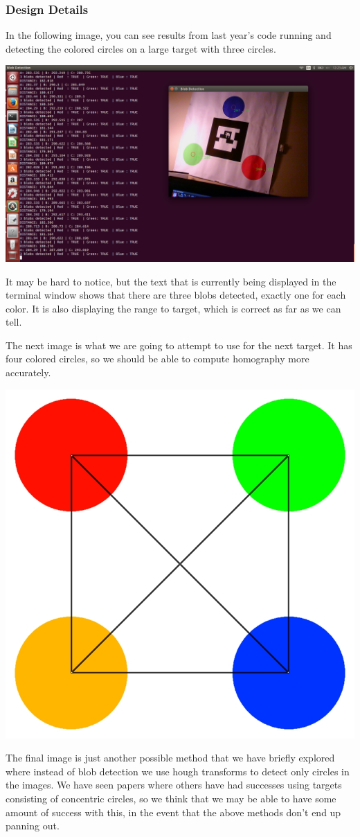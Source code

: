 \subsubsection{Design Details}
In the following image, you can see results from last year's code running and detecting the colored circles on a large target with three circles.

\begin{center} \includegraphics[width=.5\textwidth]{coolpic.png} \end{center}

It may be hard to notice, but the text that is currently being displayed in the terminal window shows that there are three blobs detected, exactly one for each color. It is also displaying the range to target, which is correct as far as we can tell.

The next image is what we are going to attempt to use for the next target. It has four colored circles, so we should be able to compute homography more accurately.

\begin{center} \includegraphics[width=.35\textwidth]{landing_guide_small_x.jpg} \end{center}

The final image is just another possible method that we have briefly explored where instead of blob detection we use hough transforms to detect only circles in the images. We have seen papers where others have had successes using targets consisting of concentric circles, so we think that we may be able to have some amount of success with this, in the event that the above methods don't end up panning out.

